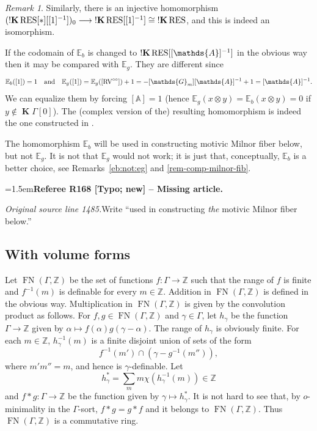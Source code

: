 \documentclass[12pt]{amsart}
\newcommand{\RefereeRemark}[4]{%
  \par\medskip\begingroup\normalfont\small\color{RefereePurple}%
  \emergencystretch=1.5em\noindent\textbf{Referee R#1 [#2] -- #3.}\par\nobreak\noindent #4\par
  \endgroup\medskip
}
\theoremstyle{plain}
\theoremstyle{definition}
\theoremstyle{remark}
\newtheorem{rem}[thm]{Remark}
\numberwithin{equation}{section}
\theoremstyle{plain}
\newcommand{\RV}{\textup{RV}}
\newcommand{\Z}{\mathds{Z}}
\newcommand{\A}{\mathds{A}}
\newcommand{\G}{\mathds{G}}
\newcommand{\omin}{$o$\nobreakdash}
\newcommand{\dand}{\quad \text{and} \quad}
\newcommand{\0}{\emptyset}
\newcommand{\bb}[1]{\mathbb{#1}}
\newcommand{\fun}{\longrightarrow}
\newcommand{\efun}{\longmapsto}
\newcommand{\RES}{\textup{RES}}
\DeclareMathOperator{\ggk}{\mathbf{K}}
\DeclareMathOperator{\sggk}{!\mathbf{K}}
\DeclareMathOperator{\fn}{FN}
\begin{document}
\begin{rem}
Similarly, there is an injective homomorphism $(\sggk \RES[*][[1]^{-1}])_0 \fun \sggk \RES[[1]^{-1}] \cong \sggk \RES$, and this is indeed an isomorphism.

If the codomain of $\bb E_b$ is changed to $\sggk \RES[[\A]^{-1}]$ in the obvious way then it may be compared with $\bb E_g$. They are different since
\begin{equation}\label{eb:neq:eg:counter}
\bb E_b([1]) = 1 \dand \bb E_g([1]) = \bb E_g([\RV^{\circ\circ}]) + 1 = -[\G_m][\A]^{-1} + 1 = [\A]^{-1}.
\end{equation}
We can equalize them by forcing $[\A] = 1$ (hence $\bb E_{g}(x \otimes y) = \bb E_{b}(x \otimes y) = 0$ if $y \notin \ggk \Gamma[0]$). The (complex version of the) resulting homomorphism is indeed the one constructed in \cite[(2.5.7)]{hru:loe:lef}.
\end{rem}

The homomorphism $\bb E_b$ will be used in constructing motivic Milnor fiber below, but not $\bb E_g$. It is not that  $\bb E_g$ would not work; it is just that, conceptually, $\bb E_b$ is a better choice,  see Remarks~\ref{eb:not:eg} and \ref{rem-comp-milnor-fib}.

\RefereeRemark{168}{Typo; new}{Missing article}{%
\textit{Original source line 1485.}\quad Write ``used in constructing \emph{the} motivic Milnor fiber below.''
}



\subsection{With volume forms}
Let $\fn(\Gamma, \Z)$ be the set of functions $f: \Gamma \fun \Z$ such that the range of $f$ is finite and $f^{-1}(m)$ is definable for every $m \in \Z$. Addition in $\fn(\Gamma, \Z)$ is defined in the obvious way. Multiplication in $\fn(\Gamma, \Z)$ is given by the convolution product as follows. For $f, g \in \fn(\Gamma, \Z)$ and $\gamma \in \Gamma$, let $h_\gamma$ be the function $\Gamma \fun \Z$ given by $\alpha \efun f(\alpha)g(\gamma - \alpha)$. The range of $h_\gamma$ is obviously finite. For each $m \in \Z$, $h_\gamma^{-1}(m)$ is a finite disjoint union of sets of the form
\[
f^{-1}(m') \cap (\gamma - g^{-1}(m'')),
\]
where $m' m'' = m$, and hence is $\gamma$-definable. Let
\[
 h_\gamma^* = \sum_{m} m \chi(h_\gamma^{-1}(m)) \in \Z
\]
and $f * g : \Gamma \fun \Z$ be the function  given by $\gamma \efun h_\gamma^*$. It is not hard to see that, by \omin-minimality in the $\Gamma$-sort, $f * g = g * f$ and it belongs to $\fn(\Gamma, \Z)$. Thus $\fn(\Gamma, \Z)$ is a commutative ring.
\end{document}
